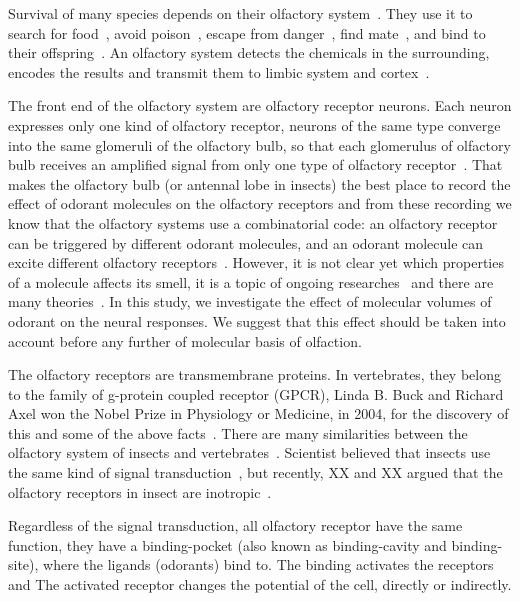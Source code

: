 \documentclass[11pt]{paper} %
\begin{document}
Survival of many species depends on their olfactory system~\cite{Ache2005}. 
They use it  to search for food~\cite{}, 
avoid poison~\cite{}, 
escape from danger~\cite{}, 
find mate~\cite{}, 
and bind to their offspring~\cite{}.
An olfactory system detects the chemicals in the surrounding, 
encodes the results and transmit them to limbic system and cortex~\cite{Menini2010}.

The front end of the olfactory system are olfactory receptor neurons. 
Each neuron expresses only one kind of olfactory receptor, 
neurons of the same type converge into the same glomeruli of the olfactory bulb,
so that each glomerulus of olfactory bulb receives an amplified signal from only one type of olfactory receptor~\cite{}.
That makes the olfactory bulb (or antennal lobe in insects) the best place to record the effect of odorant molecules on the olfactory receptors and from these recording we know that the olfactory systems use a combinatorial code: 
an olfactory receptor can be triggered by different odorant molecules, 
and an odorant molecule can excite different olfactory receptors~\cite{}.  
However, it is not clear yet which properties of a molecule affects its smell,
it is a topic of ongoing researches~\cite{Keller2004, Franco2011b, Weiss2012} and there are many theories~\cite{Turin1996, Klopping1971,Brookes2007}.
In this study, 
we investigate the effect of molecular volumes of odorant on the neural responses. 
We suggest that this effect should be taken into account before any further of molecular basis of olfaction.

The olfactory receptors are transmembrane proteins.
In vertebrates, they belong to the family of g-protein coupled receptor (GPCR), 
Linda B. Buck and Richard Axel won the Nobel Prize in Physiology or Medicine, in 2004, 
for the discovery of this and some of the above facts~\cite{Buck1991}.
There are many similarities between the olfactory system of insects and vertebrates~\cite{Wilson2013, Kaupp2010}.
Scientist believed that insects use the same kind of signal transduction~\cite{}, 
but recently, XX and XX argued that the olfactory receptors in insect are inotropic~\cite{}. 

Regardless of the signal transduction, 
all olfactory receptor have the same function, they have a binding-pocket (also known as binding-cavity and binding-site),
where the ligands (odorants) bind to. 
The binding activates the receptors and
The activated receptor changes the potential of the cell, directly or indirectly.
\end{document}
